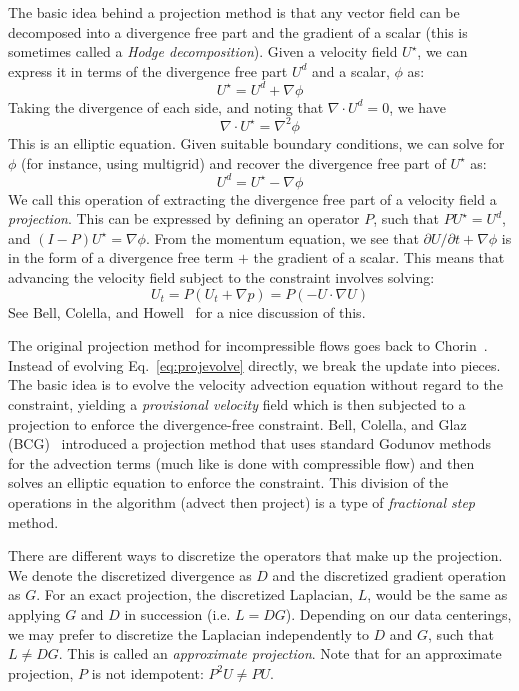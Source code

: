 The basic idea behind a projection method is that any vector field
can be decomposed into a divergence free part and the gradient of 
a scalar (this is sometimes called a {\em Hodge decomposition}).  
Given a velocity field $U^\star$, we can express it in terms of the 
divergence free part $U^d$ and a scalar, $\phi$ as:
\begin{equation}
U^\star = U^d + \nabla \phi
\end{equation}
Taking the divergence of each side, and noting that $\nabla \cdot U^d
= 0$, we have
\begin{equation}
\nabla \cdot U^\star = \nabla^2 \phi
\end{equation}
This is an elliptic equation.  Given suitable boundary conditions, we
can solve for $\phi$ (for instance, using multigrid) and recover the
divergence free part of $U^\star$ as:
\begin{equation}
U^d = U^\star - \nabla \phi
\end{equation}
We call this operation of extracting the divergence free part of a
velocity field a {\em projection}.  This can be expressed by defining
an operator $P$, such that $PU^\star = U^d$, and $(I - P)U^\star =
\nabla \phi$.  From the momentum equation, we see that $\partial
U/\partial t + \nabla \phi$ is in the form of a divergence free term
$+$ the gradient of a scalar.  This means that advancing the velocity
field subject to the constraint involves solving:
\begin{equation}
U_t = P(U_t + \nabla p) = P(-U\cdot \nabla U)
\label{eq:projevolve}
\end{equation}
See Bell, Colella, and Howell~\cite{BCH} for a nice discussion of this.

The original projection method for incompressible flows goes back to
Chorin~\cite{chorin:1968}.  Instead of evolving
Eq.~\ref{eq:projevolve} directly, we break the update into pieces.
The basic idea is to evolve the velocity advection equation without
regard to the constraint, yielding a {\em provisional velocity} field
which is then subjected to a projection to enforce the divergence-free
constraint.  Bell, Colella, and Glaz (BCG)~\cite{BCG} introduced a projection
method that uses standard Godunov methods for the advection terms
(much like is done with compressible flow) and then solves an elliptic
equation to enforce the constraint.  This division of the operations
in the algorithm (advect then project) is a type of {\em fractional
  step} method.

There are different ways to discretize the operators that make up the
projection.  We denote the discretized divergence as $D$ and the
discretized gradient operation as $G$.  For an exact projection, the
discretized Laplacian, $L$, would be the same as applying $G$ and $D$
in succession (i.e. $L = DG$).  Depending on our data centerings, we
may prefer to discretize the Laplacian independently to $D$ and $G$,
such that $L \ne DG$.  This is called an {\em approximate projection}.
Note that for an approximate projection, $P$ is not
idempotent: $P^2 U \ne PU$.

